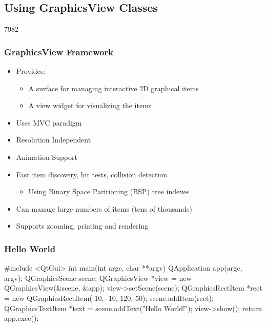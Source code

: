 %
%
%
%

\subsection{Using GraphicsView Classes}
\begin{slide}{7982}
\frametitle{GraphicsView Framework}
\begin{itemize}
\item Provides:
    \begin{itemize}
    \item A surface for managing interactive 2D graphical items
    \item A view widget for visualizing the items
    \end{itemize}
\item Uses MVC paradigm
\item Resolution Independent
\item Animation Support
\item Fast item discovery, hit tests, collision detection
    \begin{itemize}
    \item Using Binary Space Paritioning (BSP) tree indexes
    \end{itemize}
\item Can manage large numbers of items (tens of thousands)
\item Supports zooming, printing and rendering

\end{itemize}
\end{slide}


\begin{slide}[fragile]
\frametitle{Hello World}

\begin{cpp}
#include <QtGui>
int main(int argc, char **argv) {
  QApplication app(argc, argv);
  QGraphicsScene scene;
  QGraphicsView *view = new QGraphicsView(&scene, &app);
  view->setScene(scene);
  QGraphicsRectItem *rect = new QGraphicsRectItem(-10, -10, 120, 50);
  scene.addItem(rect);
  QGraphicsTextItem *text = scene.addText("Hello World!");
  view->show();
  return app.exec();
}
\end{cpp}
 \\

\end{slide}


